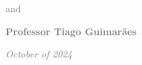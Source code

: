 \begin{titlepage}
\begin{center}
\begin{minipage}{0.3\textwidth}
        \textcolor{gray}{and}
        
        \textcolor{gray}{\textbf{Professor Tiago Guimarães}}
        
    \end{minipage}
    \vfill
\end{center}
    \vspace{0.5cm} %
    \hspace{4.2cm} %
    \textcolor{gray}{\textit{October of 2024}} 
\end{titlepage}  
